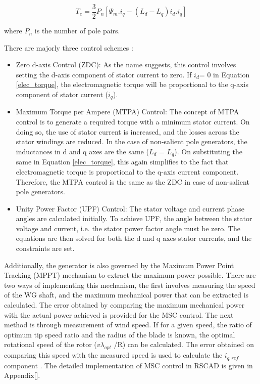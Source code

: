 \begin{equation}\label{elec_torque}
T_e = \frac{3}{2}P_n[\Psi_m.i_q-(L_d-L_q)i_d.i_q]    
\end{equation}

where $P_n$ is the number of pole pairs.


There are majorly three control schemes \cite{wu_variable-speed_2011}:

\begin{itemize}
    \item Zero d-axis Control (ZDC): As the name suggests, this control involves setting the d-axis component of stator current to zero. If $i_d$= 0 in Equation \ref{elec_torque}, the electromagnetic torque will be proportional to the q-axis component of stator current ($i_q$).  
    \item Maximum Torque per Ampere (MTPA) Control: The concept of MTPA control is to generate a required torque with a minimum stator current. On doing so, the use of stator current is increased, and the losses across the stator windings are reduced. In the case of non-salient pole generators, the inductances in d and q axes are the same ($L_d$ = $L_q$). On substituting the same in Equation \ref{elec_torque}, this again simplifies to the fact that electromagnetic torque is proportional to the q-axis current component. Therefore, the MTPA control is the same as the ZDC in case of non-salient pole generators. 
    \item Unity Power Factor (UPF) Control: The stator voltage and current phase angles are calculated initially. To achieve UPF, the angle between the stator voltage and current, i.e. the stator power factor angle must be zero. The equations are then solved for both the d and q axes stator currents, and the constraints are set. 
\end{itemize}

Additionally, the generator is also governed by the Maximum Power Point Tracking (\gls{MPPT}) mechanism to extract the maximum power possible. There are two ways of implementing this mechanism, the first involves measuring the speed of the \gls{WG} shaft, and the maximum mechanical power that can be extracted is calculated. The error obtained by comparing the maximum mechanical power with the actual power achieved is provided for the \gls{MSC} control. The next method is through measurement of wind speed. If for a given speed, the ratio of optimum tip speed ratio and the radius of the blade is known, the optimal rotational speed of the rotor ($v\lambda_{opt}$ /R) can be calculated. The error obtained on comparing this speed with the measured speed is used to calculate the $i_{q,ref}$ component \cite{ali_wind_2012}. The detailed implementation of \gls{MSC} control in RSCAD is given in Appendix[].  

